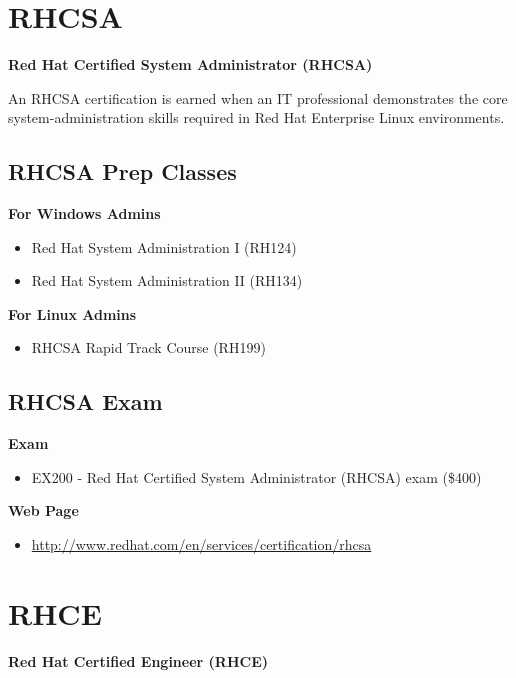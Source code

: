 \documentclass[letterpaper,10pt,english]{sphinxmanual}
\begin{document}
\section{RHCSA}
\label{intro:rhcsa}
\textbf{Red Hat Certified System Administrator (RHCSA)}

An RHCSA certification is earned when an IT professional demonstrates the core system-administration skills required in Red Hat Enterprise Linux environments.


\subsection{RHCSA Prep Classes}
\label{intro:rhcsa-prep-classes}
\textbf{For Windows Admins}
\begin{itemize}
\item {} 
Red Hat System Administration I (RH124)

\item {} 
Red Hat System Administration II (RH134)

\end{itemize}

\textbf{For Linux Admins}
\begin{itemize}
\item {} 
RHCSA Rapid Track Course (RH199)

\end{itemize}


\subsection{RHCSA Exam}
\label{intro:rhcsa-exam}
\textbf{Exam}
\begin{itemize}
\item {} 
EX200 - Red Hat Certified System Administrator (RHCSA) exam (\$400)

\end{itemize}

\textbf{Web Page}
\begin{itemize}
\item {} 
\href{http://www.redhat.com/en/services/certification/rhcsa}{http://www.redhat.com/en/services/certification/rhcsa}

\end{itemize}


\section{RHCE}
\label{intro:rhce}
\textbf{Red Hat Certified Engineer (RHCE)}
\end{document}
